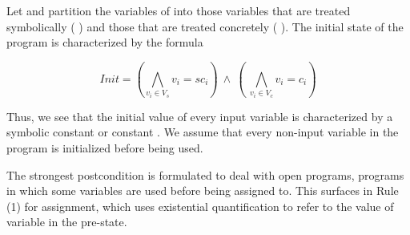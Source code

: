 ﻿\documentclass{IOS-Book-Article}
\begin{document}
\begin{mdP}[class={indent,para-continue},data-line={511}]%
{}Let %
{}%
{} and %
{}%
{} partition the variables of %
{}%
{} into those variables
that are treated symbolically (%
{}%
{}) and those that are treated concretely 
(%
{}%
{}). The initial state of the program is characterized by the formula%
\end{mdP}%
\begin{mdDiv}[class={equation,para-block},label={[(1)]\{.equation-label\}},elem={equation},line-adjust={0},data-line={515}]%
{}%
{}
\begin{mdDiv}[class={mathdisplay,para-block,input-math},elem={mathdisplay},color={},math-needpdf={},line-adjust={0},data-line={516}]%
\begin{mdDiv}[class={math-display}]%
\[%
Init = (\bigwedge_{v_i \in V_s} v_i = sc_i) ~\wedge~ (~\bigwedge_{v_i \in V_c} v_i = c_i)
\]%
\end{mdDiv}%
\end{mdDiv}%
\end{mdDiv}%
\begin{mdP}[data-line={519}]%
{}Thus, we see that the initial value of every input variable is characterized by 
a symbolic constant %
{}%
{} or constant %
{}%
{}.  We assume that every non-input
variable in the program is initialized before being used.%
\end{mdP}%
\begin{mdP}[class={indent},data-line={523}]%
{}The strongest postcondition is formulated to deal with open programs,
programs in which some variables are used before being assigned to. 
This surfaces in Rule (1) for assignment, which uses existential quantification
to refer to the value of variable %
{}%
{} in the pre-state.%
\end{mdP}%
\end{document}
